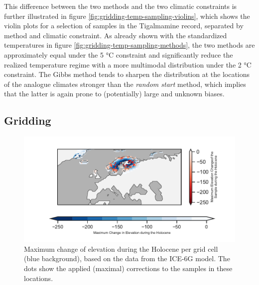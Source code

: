 \documentclass[
11pt, %
english, %
singlespacing, %
headsepline, %
]{MastersDoctoralThesis} %
\begin{document}
\begin{NoHyper}
\begin{refsection}
This difference between the two methods and the two climatic constraints is further illustrated in figure \ref{fig:gridding-temp-sampling-violins}, which shows the violin plots for a selection of samples in the Tigalmamine record, separated by method and climatic constraint. As already shown with the standardized temperatures in figure \ref{fig:gridding-temp-sampling-methods}, the two methods are approximately equal under the 5 °C constraint and significantly reduce the realized temperature regime with a more multimodal distribution under the 2 °C constraint. The Gibbs method tends to sharpen the distribution at the locations of the analogue climates stronger than the \textit{random start} method, which implies that the latter is again prone to (potentially) large and unknown biases. 

\subsection{Gridding}  \label{sec:gridding-gridding}

\begin{figure}
	\includegraphics[width=\linewidth]{gridding-figures/elevation-diff.pdf}
	\caption[Elevation difference and corrections]{Maximum change of elevation during the Holocene per grid cell (blue background), based on the data from the ICE-6G model. The dots show the applied (maximal) corrections to the samples in these locations.}
	\label{fig:gridding-elev-correction}
\end{figure}


\end{refsection}
\end{NoHyper}
\end{document}
